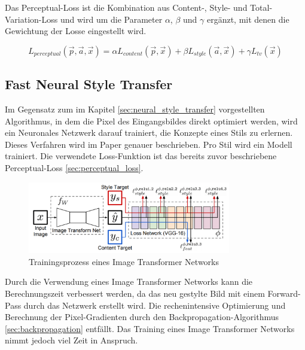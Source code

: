 Das Perceptual-Loss ist die Kombination aus Content-, Style- und Total-Variation-Loss und wird um die Parameter $ \alpha $, $ \beta $ und $ \gamma $ ergänzt, mit denen die Gewichtung der Losse eingestellt wird.

\begin{equation}
	\label{eq:perceptual_loss}
    L_{perceptual} ( \vec{p}, \vec{a}, \vec{x} ) = \alpha L_{content} ( \vec{p}, \vec{x} ) + \beta L_{style} ( \vec{a}, \vec{x} ) + \gamma L_{tv} ( \vec{x} )
\end{equation}

\subsection{Fast Neural Style Transfer}
\label{sec:fast_neural_style_transfer}

Im Gegensatz zum im Kapitel \ref{sec:neural_style_transfer} vorgestellten Algorithmus, in dem die Pixel des Eingangsbildes direkt optimiert werden, wird ein Neuronales Netzwerk darauf trainiert, die Konzepte eines Stils zu erlernen. Dieses Verfahren wird im Paper \cite{DBLP:journals/corr/JohnsonAL16} genauer beschrieben. Pro Stil wird ein Modell trainiert. Die verwendete Loss-Funktion ist das bereits zuvor beschriebene Perceptual-Loss \ref{sec:perceptual_loss}.

\begin{figure}[H]
	\centering
	\includegraphics[width=0.79\textwidth]{resources/content/fast_neural_style.png}
	\caption{Trainingsprozess eines Image Transformer Networks \cite{DBLP:journals/corr/JohnsonAL16}}
	\label{img:fast_neural_style_transfer}
\end{figure}

Durch die Verwendung eines Image Transformer Networks kann die Berechnungszeit verbessert werden, da das neu gestylte Bild mit einem Forward-Pass durch das Netzwerk erstellt wird. Die rechenintensive Optimierung und Berechnung der Pixel-Gradienten durch den Backpropagation-Algorithmus \ref{sec:backpropagation} entfällt. Das Training eines Image Transformer Networks nimmt jedoch viel Zeit in Anspruch.